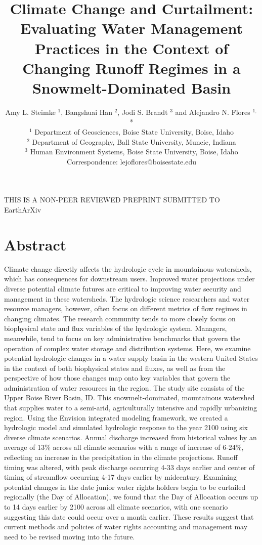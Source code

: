 \documentclass[11pt,letterpaper]{article}
\title{Climate Change and Curtailment: Evaluating Water Management Practices in the Context of Changing Runoff Regimes in a Snowmelt-Dominated Basin}
\author{Amy L. Steimke $^{1}$, Bangshuai Han $^{2}$, Jodi S. Brandt $^{3}$ and Alejandro N. Flores $^{1,}$* \\
$^{1}$ \quad Department of Geosciences, Boise State University, Boise, Idaho\\
$^{2}$ \quad Department of Geography, Ball State University, Muncie, Indiana\\
$^{3}$ \quad Human Environment Systems, Boise State University, Boise, Idaho\\
Correspondence: lejoflores@boisestate.edu}
\begin{document}
\maketitle
\begin{center}
\MakeUppercase{This is a non-peer reviewed preprint submitted to} EarthArXiv
\end{center}

\linenumbers
{}

\section*{Abstract}
Climate change directly affects the hydrologic cycle in mountainous watersheds, which has consequences for downstream users. Improved water projections under diverse potential climate futures are critical to improving water security and management in these watersheds. The hydrologic science researchers and water resource managers, however, often focus on different metrics of flow regimes in changing climates. The research community tends to more closely focus on biophysical state and flux variables of the hydrologic system. Managers, meanwhile, tend to focus on key administrative benchmarks that govern the operation of complex water storage and distribution systems. Here, we examine potential hydrologic changes in a water supply basin in the western United States in the context of both biophysical states and fluxes, as well as from the perspective of how those changes map onto key variables that govern the administration of water resources in the region. The study site consists of the Upper Boise River Basin, ID. This snowmelt-dominated, mountainous watershed that supplies water to a semi-arid, agriculturally intensive and rapidly urbanizing region. Using the Envision integrated modeling framework, we created a hydrologic model and simulated hydrologic response to the year 2100 using six diverse climate scenarios. Annual discharge increased from historical values by an average of 13\% across all climate scenarios with a range of increase of 6-24\%, reflecting an increase in the precipitation in the climate projections.  Runoff timing was altered, with peak discharge occurring 4-33 days earlier and center of timing of streamflow occurring 4-17 days earlier by midcentury. Examining potential changes in the date junior water rights holders begin to be curtailed regionally (the Day of Allocation), we found that the Day of Allocation occurs up to 14 days earlier by 2100 across all climate scenarios, with one scenario suggesting this date could occur over a month earlier. These results suggest that current methods and policies of water rights accounting and management may need to be revised moving into the future.
\end{document}
